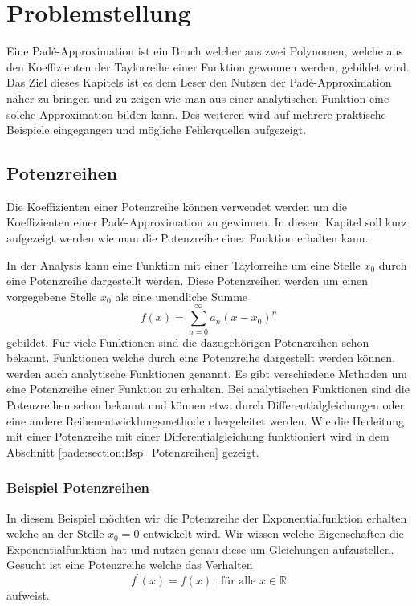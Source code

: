 %
%
%

\section{Problemstellung
\label{pade:section:Problemstellung}}
Eine Padé-Approximation ist ein Bruch welcher aus zwei Polynomen, welche aus den Koeffizienten der Taylorreihe einer Funktion gewonnen werden, gebildet wird. 
Das Ziel dieses Kapitels ist es dem Leser den Nutzen der Padé-Approximation näher zu bringen und zu zeigen wie man aus einer analytischen Funktion eine solche Approximation bilden kann.
Des weiteren wird auf mehrere praktische Beispiele eingegangen und mögliche Fehlerquellen aufgezeigt. 



\subsection{Potenzreihen
\label{pade:subsection:Potenzreihen}}
Die Koeffizienten einer Potenzreihe können verwendet werden um die Koeffizienten einer Padé-Approximation zu gewinnen. 
In diesem Kapitel soll kurz aufgezeigt werden wie man die Potenzreihe einer Funktion erhalten kann. 

In der Analysis kann eine Funktion mit einer Taylorreihe um eine Stelle $x_{0}$ durch eine Potenzreihe dargestellt werden. 
Diese Potenzreihen werden um einen vorgegebene Stelle $x_{0}$ als eine unendliche Summe 
\begin{equation}
f(x)=\sum_{n=0}^{\infty} a_{n} (x-x_{0})^{n} 
\label{pade:expofunk}
\end{equation}
gebildet.
Für viele Funktionen sind die dazugehörigen Potenzreihen schon bekannt. 
Funktionen welche durch eine Potenzreihe dargestellt werden können, werden auch analytische Funktionen genannt.
Es gibt verschiedene Methoden um eine Potenzreihe einer Funktion zu erhalten. 
Bei analytischen Funktionen sind die Potenzreihen schon bekannt und können etwa durch Differentialgleichungen oder eine andere Reihenentwicklungsmethoden hergeleitet werden.
Wie die Herleitung mit einer Potenzreihe mit einer Differentialgleichung funktioniert wird in dem Abschnitt \ref{pade:section:Bsp_Potenzreihen} gezeigt.

\subsubsection{Beispiel Potenzreihen
\label{pade:section:Bsp_Potenzreihen}}
In diesem Beispiel möchten wir die Potenzreihe der Exponentialfunktion erhalten welche an der Stelle $x_0 = 0$ entwickelt wird. 
Wir wissen welche Eigenschaften die Exponentialfunktion hat und nutzen genau diese um Gleichungen aufzustellen. 
Gesucht ist eine Potenzreihe welche das Verhalten 
\begin{equation*}
	f^{\prime}(x) = f(x) , \text{ für alle } x \in \mathbb{R} 
\end{equation*}
aufweist.

